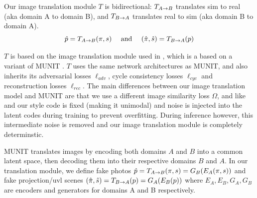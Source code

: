 \documentclass{article}
\begin{document}






		Our image translation module $T$ is bidirectional: $T_{A\rightarrow B}$ translates sim to real (aka domain A to domain B), and $T_{B\rightarrow A}$ translates real to sim (aka domain B to domain A).
		\begin{equation}
			\hat{p}=T_{A\rightarrow B}(\pi,s)  \ \ \ \text{ and }\ \ \   (\hat{\pi},\hat{s})=T_{B\rightarrow A}(p)
		\end{equation}
			
		$T$ is based on the image translation module used in \citet{surgical_video_translation}, which is a based on a variant \cite{surgical_image_translation} of MUNIT \cite{munit}. 
		$T$ uses the same network architectures as MUNIT, and also inherits its adversarial losses $\ell_{adv}$, cycle consistency losses $\ell_{cyc}$ and reconstruction losses $\ell_{rec}$.
		The main differences between our image translation model and MUNIT are that we use a different image similarity loss $\Omega$, and like \citet[]{surgical_image_translation} and \citet[]{surgical_video_translation} our style code is fixed (making it unimodal) and noise is injected into the latent codes during training to prevent overfitting. 
		During inference however, this intermediate noise is removed and our image translation module is completely determinstic. 

		MUNIT translates images by encoding both domains $A$ and $B$ into a common latent space, then decoding them into their respective domains  $B$ and $A$.
		In our translation module, we define fake photos $\hat{p} = T_{A\rightarrow B}(\pi,s) = G_B(E_A(\pi,s))$ and fake projection/uvl scenes $(\hat{\pi},\hat{s}) = T_{B\rightarrow A}(p) = G_A(E_B(p))$
			where $E_A, E_B, G_A, G_B$ are encoders and generators for domains A and B respectively.
\end{document}
